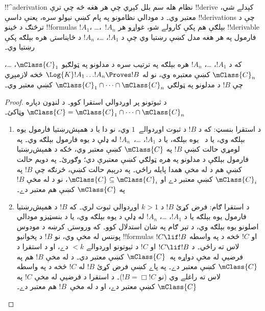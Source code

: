\documentclass[../../../include/open-logic-section]{subfiles}
\begin{document}


!!^a{derivation} نظام هله سم بلل کېږي چې هر هغه څه چې ترې
!!{derive} کېدلے شي، معتبر وي۔ د مودالي نظامونو په پام کښې نيولو سره،
يعنې داسې !!{derivation}s چې د  ترڅنګ د ځينو !!{formula}s
$!A_1$، \dots،~$!A_n$ بېلګې هم پکې کارولے شو، غواړو هر !!{derivable}
فارمول په هر هغه مدل کښې رښتيا وي چې د $!A_1$، \dots، $!A_n$
د ځايناستۍ هره بېلګه پکې رښتيا وي۔

\begin{thm}
  که د $!A_1$، \dots، $!A_n$ هره بېلګه په ترتيب سره د مدلونو په
  ټولګيو $\mClass{C}_1$، \dots، $\mClass{C}_n$ کښې معتبره وي،
  نو له $\Log{K}!A_1\dots !A_n
  \Proves !B$ څخه لازمېږي چې $!B$ د مدلونو په ټولګي
  $\mClass{C}_1 \cap \dots \cap \mClass{C}_n$ کښې معتبر وي۔
\end{thm}

\begin{proof}
  د ثبوتونو پر اوږدوالي استقرا کوو۔ د لنډون دپاره $\mClass{C} =
  \mClass{C}_1 \cap \dots \cap \mClass{C}_n$ وټاکئ۔
  \begin{enumerate}
  \item د استقرا بنسټ: که د $!B$ د ثبوت اوږدوالے~$1$ وي، نو دا يا
    د همېش‌رښتيا فارمول يوه بېلګه وي، يا د~ يوه بېلګه،
     يا د
    $!A_1$، \dots،~$!A_n$ له ډلې د يوه فارمول بېلګه وي۔ په لومړي
    حالت کښې $!B$ په $\mClass{C}$ کښې معتبر وي، ځکه د همېش‌رښتيا
    فارمول بېلګې د مدلونو په \emph{هره} ټولګي کښې معتبرې دي؛
     وګورئ۔ په دويم حالت کښې هم
    د  له مخې همدا پايله راځي۔
    په درېيم حالت کښې، څرنګه چې $!B$ په $\mClass{C}_i$ کښې معتبر دے
    او $\mClass{C} \subseteq
    \mClass{C}_i$، نو د  له مخې
    $!B$ په $\mClass{C}$ کښې هم معتبر دے۔
  \item د استقرا ګام: فرض کړئ $!B$ د $k>1$ اوږدوالي ثبوت لري۔ که
    $!B$ د همېش‌رښتيا فارمول يوه بېلګه يا د $!A_1$،
    \dots، $!A_n$ له ډلې د يوه بېلګه وي، يا د بنسټيزو مودالي
    اصلونو يوه بېلګه وي، د تېر ګام په شان استدلال کوو۔ که وروستۍ
    کرښه د مودوس پوننس له مخې وي، نو $!B$ د پخوانيو !!{formula}s $!C \lif !B$ او
    $!C$ څخه د \MP{} په واسطه لاس ته راځي۔ د $!C \lif !B$ او
    $!C$ د ثبوتونو اوږدوالے $<k$ دے، او د استقرا د فرضيې له مخې
    دواړه په~$\mClass{C}$ کښې معتبر دي۔ د
     له مخې $!B$ هم په $\mClass{C}$
    کښې معتبر دے۔ په پاے کښې فرض کړئ $!B$ له $!C$ څخه د \Nec{} په
    واسطه لاس ته راغلے وي (نو $!B = \Box!C$)۔ د استقرا د فرضيې له
    مخې $!C$ په $\mClass{C}$ کښې معتبر دے، او د
     له مخې~$!B$ هم معتبر دے۔
  \end{enumerate}
\end{proof}
\end{document}

